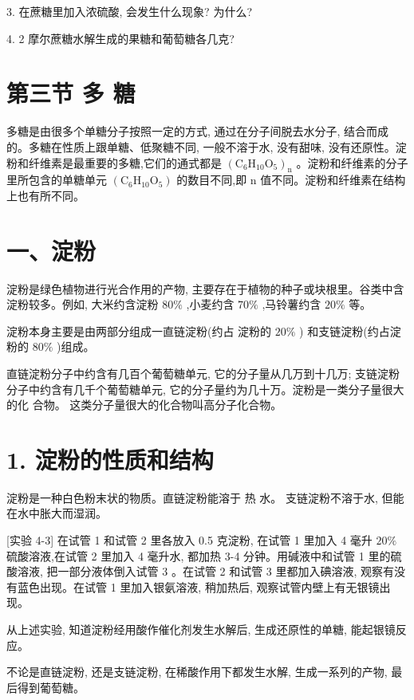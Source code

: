 \documentclass[10pt]{article}
\begin{document}
3. 在蔗糖里加入浓硫酸, 会发生什么现象? 为什么?

4. 2 摩尔蔗糖水解生成的果糖和葡萄糖各几克?

\section*{第三节 多 糖}

多糖是由很多个单糖分子按照一定的方式, 通过在分子间脱去水分子, 结合而成的。多糖在性质上跟单糖、低聚糖不同, 一般不溶于水, 没有甜味, 没有还原性。淀粉和纤维素是最重要的多糖,它们的通式都是 \({\left( {\mathrm{C}}_{6}{\mathrm{H}}_{10}{\mathrm{O}}_{5}\right) }_{\mathrm{n}}\) 。淀粉和纤维素的分子里所包含的单糖单元 \(\left( {{\mathrm{C}}_{6}{\mathrm{H}}_{10}{\mathrm{O}}_{5}}\right)\) 的数目不同,即 \(\mathrm{n}\) 值不同。淀粉和纤维素在结构上也有所不同。

\section*{一、淀粉}

淀粉是绿色植物进行光合作用的产物, 主要存在于植物的种子或块根里。谷类中含淀粉较多。例如, 大米约含淀粉 \({80}\%\) ,小麦约含 \({70}\%\) ,马铃薯约含 \({20}\%\) 等。

淀粉本身主要是由两部分组成一直链淀粉(约占 淀粉的 \({20}\%\) ) 和支链淀粉(约占淀粉的 \({80}\%\) )组成。

直链淀粉分子中约含有几百个葡萄糖单元, 它的分子量从几万到十几万; 支链淀粉分子中约含有几千个葡萄糖单元, 它的分子量约为几十万。淀粉是一类分子量很大的化 合物。 这类分子量很大的化合物叫高分子化合物。

\section*{1. 淀粉的性质和结构}

淀粉是一种白色粉末状的物质。直链淀粉能溶于 热 水。 支链淀粉不溶于水, 但能在水中胀大而湿润。

[实验 4-3] 在试管 1 和试管 2 里各放入 0.5 克淀粉, 在试管 1 里加入 4 毫升 \({20}\%\) 硫酸溶液,在试管 2 里加入 4 毫升水, 都加热 3-4 分钟。用碱液中和试管 1 里的硫酸溶液, 把一部分液体倒入试管 3 。在试管 2 和试管 3 里都加入碘溶液, 观察有没有蓝色出现。在试管 1 里加入银氨溶液, 稍加热后, 观察试管内壁上有无银镜出现。

从上述实验, 知道淀粉经用酸作催化剂发生水解后, 生成还原性的单糖, 能起银镜反应。

不论是直链淀粉, 还是支链淀粉, 在稀酸作用下都发生水解, 生成一系列的产物, 最后得到葡萄糖。
\end{document}
